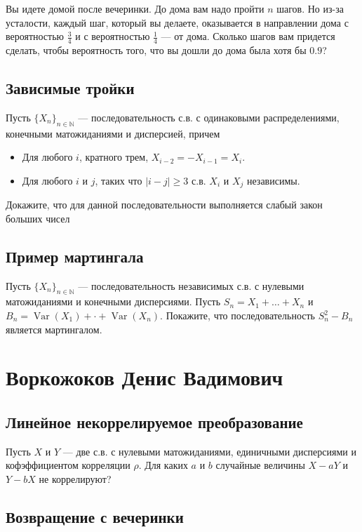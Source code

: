 \documentclass[12pt]{article}
\newcommand\N{\mathbb{N}}
\DeclareMathOperator{\Var}{Var}
\begin{document}
Вы идете домой после вечеринки. До дома вам надо пройти $n$ шагов. Но из-за усталости, каждый шаг, который вы делаете, оказывается в направлении дома с вероятностью $\frac{3}{4}$ и с вероятностью $\frac{1}{4}$ --- от дома. Сколько шагов вам придется сделать, чтобы вероятность того, что вы дошли до дома была хотя бы $0.9$?

\subsection{Зависимые тройки}
Пусть $\{X_n\}_{n \in \N}$ --- последовательность с.в. с одинаковыми распределениями, конечными матожиданиями и дисперсией, причем
\begin{itemize}
    \item Для любого $i$, кратного трем, $X_{i - 2} = - X_{i - 1} = X_{i}$. 
    \item Для любого $i$ и $j$, таких что $|i - j| \ge 3$ с.в. $X_i$ и $X_j$ независимы.
\end{itemize}
Докажите, что для данной последовательности выполняется слабый закон больших чисел


\subsection{Пример мартингала}

Пусть $\{X_n\}_{n \in \N}$ --- последовательность независимых с.в. с нулевыми матожиданиями и конечными дисперсиями. Пусть $S_n = X_1 + \dots + X_n$ и $B_n = \Var(X_1) + \cdot + \Var(X_n)$. Покажите, что последовательность $S_n^2 - B_n$ является мартингалом.


\newpage
\section{Воркожоков Денис Вадимович}

\subsection{Линейное некоррелируемое преобразование}

Пусть $X$ и $Y$ --- две с.в. с нулевыми матожиданиями, единичными дисперсиями и кофэффициентом корреляции $\rho$. Для каких $a$ и $b$ случайные величины $X - aY$ и $Y - bX$ не коррелируют?


\subsection{Возвращение с вечеринки}
\end{document}

